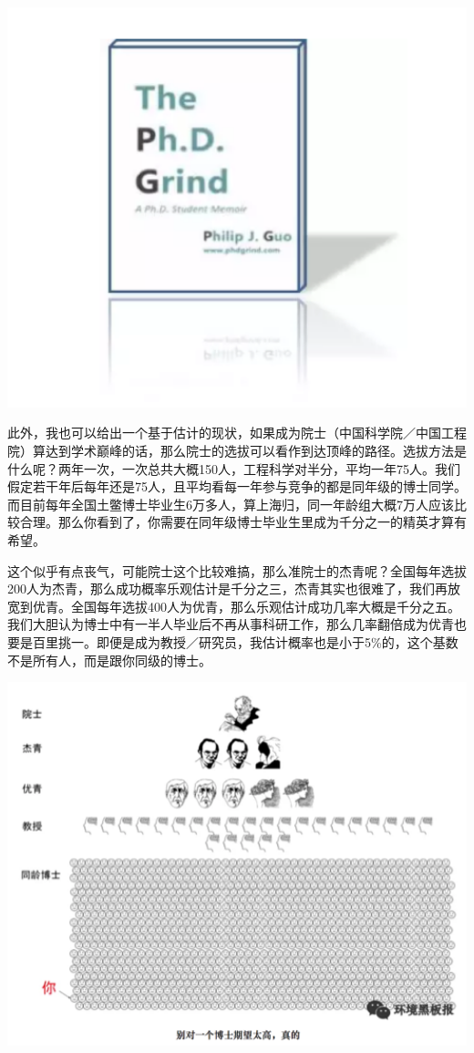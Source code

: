 \documentclass[
]{book}
\begin{document}
\includegraphics[width=6.67in]{images/hhcs2}

此外，我也可以给出一个基于估计的现状，如果成为院士（中国科学院／中国工程院）算达到学术巅峰的话，那么院士的选拔可以看作到达顶峰的路径。选拔方法是什么呢？两年一次，一次总共大概150人，工程科学对半分，平均一年75人。我们假定若干年后每年还是75人，且平均看每一年参与竞争的都是同年级的博士同学。而目前每年全国土鳖博士毕业生6万多人，算上海归，同一年龄组大概7万人应该比较合理。那么你看到了，你需要在同年级博士毕业生里成为千分之一的精英才算有希望。

这个似乎有点丧气，可能院士这个比较难搞，那么准院士的杰青呢？全国每年选拔200人为杰青，那么成功概率乐观估计是千分之三，杰青其实也很难了，我们再放宽到优青。全国每年选拔400人为优青，那么乐观估计成功几率大概是千分之五。我们大胆认为博士中有一半人毕业后不再从事科研工作，那么几率翻倍成为优青也要是百里挑一。即便是成为教授／研究员，我估计概率也是小于5\%的，这个基数不是所有人，而是跟你同级的博士。

\includegraphics[width=6.67in]{images/hhcs3}
\end{document}
